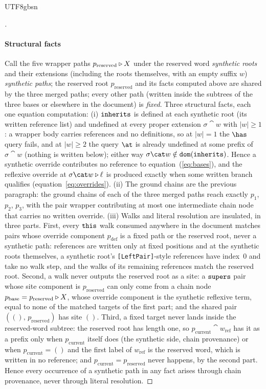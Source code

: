 \begin{CJK*}{UTF8}{gbsn}
\begin{proof}[]
  \paragraph{Structural facts}
  Call the five wrapper paths $p_{\mathrm{reserved}} \mathbin{\triangleright} X$ under
  the reserved word \emph{synthetic roots} and their extensions
  (including the roots themselves, with an empty suffix $w$)
  \emph{synthetic paths}; the reserved root $p_{\mathrm{reserved}}$
  and its facts computed above are shared by the three merged paths;
  every other path (written inside the subtrees of the three bases
  or elsewhere in the document) is \emph{fixed}. Three structural
  facts, each one equation computation:
  (i) $\mathtt{inherits}$ is defined at each synthetic root (its written
  reference list) and undefined at every proper extension
  $\sigma \cat w$ with $|w| \ge 1$: a wrapper body carries references
  and no definitions, so at $|w| = 1$ the $\has$ query fails, and at
  $|w| \ge 2$ the query $\at$ is already undefined at some prefix of
  $\sigma \cat w$ (nothing is written below); either way
  $\sigma \cat w \notin \dom(\inherits)$. Hence a synthetic override
  contributes no reference to equation~(\ref{eq:bases}), and the
  reflexive override at $\sigma \cat w \snoc \ell$ is produced
  exactly when some written branch qualifies
  (equation~\ref{eq:overrides}).
  (ii) The ground chains are the previous paragraph: the ground
  chains of each of the three merged paths reach exactly $p_1$,
  $p_2$, $p_3$, with the pair wrapper contributing at most one
  intermediate chain node that carries no written override.
  (iii) Walks and literal resolution are insulated, in three parts.
  First, every $\mathtt{this}$ walk consumed anywhere in the document
  matches pairs whose override component $p_{\mathrm{def}}$ is a
  fixed path or the reserved root, never a synthetic path:
  references are written only at fixed positions and at the
  synthetic roots themselves, a synthetic root's
  \texttt{[LeftPair]}-style references have index~0 and
  take no walk step, and the walks of its remaining references
  match the reserved root. Second, a walk never outputs the
  reserved root as a site: a $\mathtt{supers}$ pair whose site component is
  $p_{\mathrm{reserved}}$ can only come from a chain node
  $p_{\mathrm{base}} = p_{\mathrm{reserved}} \mathbin{\triangleright} X$, whose
  override component is the synthetic reflexive term, equal to none
  of the matched targets of the first part; and the shared pair
  $((),\, p_{\mathrm{reserved}})$ has site $()$. Third, a fixed
  target never lands inside the reserved-word subtree: the reserved
  root has length one, so
  $p_{\mathrm{current}} \cat w_{\mathrm{ref}}$ has it as a prefix
  only when $p_{\mathrm{current}}$ itself does (the synthetic side,
  chain provenance) or when $p_{\mathrm{current}} = ()$ and the
  first label of $w_{\mathrm{ref}}$ is the reserved word, which is
  written in no reference; and
  $p_{\mathrm{current}} = p_{\mathrm{reserved}}$ never happens, by
  the second part. Hence every occurrence of a synthetic path in
  any fact arises through chain provenance, never through literal
  resolution.


\end{proof}
\end{CJK*}
